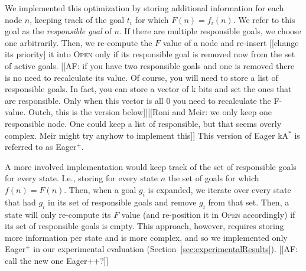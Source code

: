 \documentclass[twoside,11pt]{article}
\newcommand{\kastar}{kA$^*$\xspace}
\newcommand{\open}{\textsc{Open}\xspace}
\begin{document}
We implemented this optimization by storing additional information for each node $n$, keeping track of the goal $t_i$ for which $F(n)=f_i(n)$.
We refer to this goal as the \emph{responsible goal} of $n$.
If there are multiple responsible goals, we choose one arbitrarily.
Then, we re-compute the $F$ value of a node and re-insert [[change its priority] it into \open only if its responsible goal is removed now from the set of active goals. [[AF: if you have two responsible goals and one is removed there is no need to recalculate its value. Of course, you will need to store a list of responsible goals. In fact, you can store a vector of k bits and set the ones that are responsible. Only when this vector is all 0 you need to recalculate the F-value. Outch, this is the version below]][[Roni and Meir: we only keep one responsible node. One could keep a list of responsible, but that seems overly complex. Meir might try anyhow to implement this]]
This version of Eager \kastar is referred to as Eager$^+$.

A more involved implementation would keep track of the set of responsible goals for every state.
I.e., storing for every state $n$ the set of goals for which $f(n)=F(n)$.
Then, when a goal $g_i$ is expanded, we iterate over every state that had $g_i$ in its set of responsible goals and remove $g_i$ from that set.
Then, a state will only re-compute its $F$ value (and re-position it in \open accordingly) if its set of responsible goals is empty.
This approach, however, requires storing more information per state and is more complex, and so we implemented only Eager$^+$ in our experimental evaluation (Section~\ref{sec:experimentalResults}). [[AF: call the new one Eager++?]] %

\end{document}

